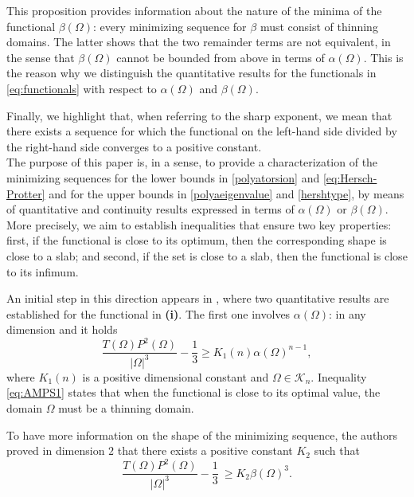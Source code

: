 \documentclass[oneside,a4paper,11pt,notitlepage]{article}
\newcommand{\abs}[1]{{\left|#1\right|}}
\theoremstyle{definition}
\theoremstyle{plain}
\theoremstyle{definition}
\begin{document}
This proposition provides information about the nature of the minima of the functional $\beta(\Omega)$: every minimizing sequence for $\beta$ must consist of thinning domains.
The latter shows that the two remainder terms are not equivalent, in the sense that $\beta(\Omega)$ cannot be bounded from above in terms of $\alpha(\Omega)$. This is the reason why we distinguish the quantitative results for the functionals in \eqref{eq:functionals} with respect to $\alpha(\Omega)$ and $\beta(\Omega)$.

 Finally, we highlight that, when referring to the sharp exponent, we mean that there exists a sequence for which the functional on the left-hand side divided by the right-hand side converges to a positive constant.\\
 The purpose of this paper is, in a sense, to provide a characterization of the minimizing sequences for the lower bounds in \eqref{polyatorsion} and \eqref{eq:Hersch-Protter} and for the upper bounds in \eqref{polyaeigenvalue} and \eqref{hershtype}, by means of quantitative and continuity results expressed in terms of $\alpha(\Omega)$ or $\beta(\Omega)$. More precisely, we aim to establish inequalities that ensure two key properties: first, if the functional is close to its optimum, then the corresponding shape is close to a slab; and second, if the set is close to a slab, then the functional is close to its infimum.

An initial step in this direction appears in \cite{AMPS}, where two quantitative results are established for the functional in \textbf{(i)}.
The first one involves $\alpha(\Omega)$: in any dimension and it holds
\begin{equation}\label{eq:AMPS1}
    \frac{T(\Omega) P^2(\Omega)}{\abs{\Omega}^3}-\frac{1}{3}\ge K_1(n)\alpha(\Omega)^{n-1},
\end{equation}
where $K_1(n)$ is a positive dimensional constant and $\Omega\in \mathcal{K}_n$. Inequality \eqref{eq:AMPS1} states that when the functional is close to its optimal value, the domain $\Omega$ must be a thinning domain.

 To have more information on the shape of the minimizing sequence, the authors proved in dimension $2$ that there exists a  positive constant $K_2$ such that
\begin{equation}\label{eq:AMPS3}
\frac{T(\Omega) P^2(\Omega)}{\abs{\Omega}^3}-\frac{1}{3}\ \ge K_2 \beta(\Omega)^3.    
\end{equation} 
\end{document}
